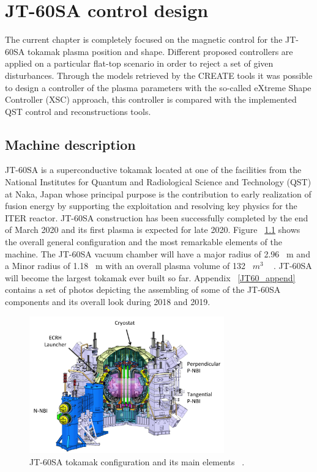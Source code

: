 \chapter{JT-60SA control design}

The current chapter is completely  focused on the magnetic control for  the JT-60SA tokamak  plasma position and shape. Different proposed  controllers  are applied  on a particular flat-top scenario in order to reject a set of given disturbances. Through the models retrieved by the CREATE tools it was possible to design a controller of the plasma parameters with the so-called eXtreme Shape Controller (XSC) approach, this controller is compared with the implemented QST control and reconstructions tools.   

\section{Machine description}

JT-60SA is a superconductive tokamak located at one of the facilities from the National Institutes for Quantum and Radiological Science and Technology (QST)  at  Naka, Japan whose principal purpose is  the contribution to early realization of fusion energy by supporting the exploitation and resolving key physics for the ITER reactor.  JT-60SA construction has been successfully completed by the end of March 2020 and its first plasma is expected for late 2020. Figure ~\ref{JT60schm} shows the overall general configuration and the most remarkable elements of the machine. The JT-60SA  vacuum chamber will have a major radius of 2.96~ m and a Minor radius of 1.18~ m with an overall plasma volume of 132~ $m^3$ ~\cite{Spears2014} . JT-60SA will become the largest tokamak ever built so far. Appendix ~\ref{JT60_append} contains a set of photos depicting the assembling of some of the JT-60SA components and its overall look during 2018 and 2019. 
\smallskip

\begin{figure}[h]
	\centering
	\includegraphics[width=0.75\textwidth]{Chp3/JT60SA.png}
	
	\caption{\label{JT60schm}JT-60SA tokamak configuration and its main elements ~\cite{JT60SA:ResearchPlan}.}
\end{figure}

